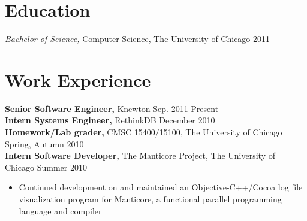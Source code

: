 \documentclass[line,overlapped]{res}
\begin{document}

\address{jordanthelewis@gmail.com \hspace{1.63in} 325 E. 16th St. Apt. 2, Brooklyn, NY 11226}


\newsectionwidth{.2in}
\begin{resume}

\section{Education}
{\sl Bachelor of Science,} Computer Science, The University of Chicago \hfill 2011\\

\section{Work Experience}
{\bf Senior Software Engineer,} Knewton \hfill Sep. 2011-Present\\
{\bf Intern Systems Engineer,} RethinkDB \hfill December 2010\\
{\bf Homework/Lab grader,} CMSC 15400/15100, The University of Chicago \hfill Spring, Autumn 2010\\
{\bf Intern Software Developer,} The Manticore Project, The University of Chicago \hfill Summer 2010
\begin{itemize} \itemsep -2pt
    \item Continued development on and maintained an Objective-C++/Cocoa log file visualization program for Manticore, a functional parallel programming language and compiler
\end{itemize}

\vspace{-10pt}


\end{resume}
\end{document}
